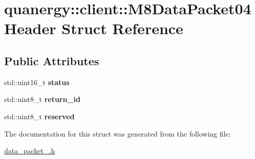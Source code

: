 \hypertarget{structquanergy_1_1client_1_1M8DataPacket04Header}{\section{quanergy\-:\-:client\-:\-:M8\-Data\-Packet04\-Header Struct Reference}
\label{structquanergy_1_1client_1_1M8DataPacket04Header}
}
\subsection*{Public Attributes}
\begin{DoxyCompactItemize}
\item 
\hypertarget{structquanergy_1_1client_1_1M8DataPacket04Header_a95367db8adefccee232d7612eb6fc9ba}{std\-::uint16\-\_\-t {\bfseries status}}\label{structquanergy_1_1client_1_1M8DataPacket04Header_a95367db8adefccee232d7612eb6fc9ba}

\item 
\hypertarget{structquanergy_1_1client_1_1M8DataPacket04Header_a3b04a8ab4cd2c30b07ac878f4360cedb}{std\-::uint8\-\_\-t {\bfseries return\-\_\-id}}\label{structquanergy_1_1client_1_1M8DataPacket04Header_a3b04a8ab4cd2c30b07ac878f4360cedb}

\item 
\hypertarget{structquanergy_1_1client_1_1M8DataPacket04Header_a384ed28e289a1cbbb295626f52aab874}{std\-::uint8\-\_\-t {\bfseries reserved}}\label{structquanergy_1_1client_1_1M8DataPacket04Header_a384ed28e289a1cbbb295626f52aab874}

\end{DoxyCompactItemize}


The documentation for this struct was generated from the following file\-:\begin{DoxyCompactItemize}
\item 
\hyperlink{data__packet__04_8h}{data\-\_\-packet\-\_.\-h}\end{DoxyCompactItemize}
